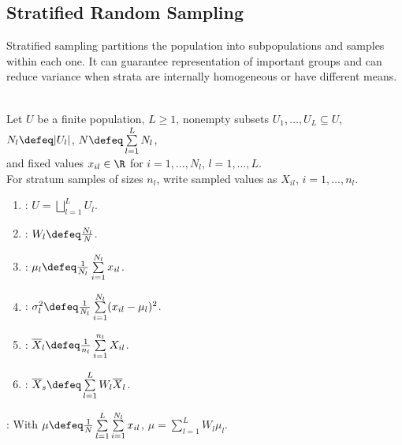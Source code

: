 \subsection{Stratified Random Sampling}

Stratified sampling partitions the population into subpopulations and samples
within each one.  It can guarantee representation of important groups and can
reduce variance when strata are internally homogeneous or have different means.

\begin{definition} \label{def:stratified-sampling-notation} \\
Let $U$ be a finite population, $L\geq1$, nonempty subsets $U_1,\ldots,U_L\subseteq U$, $N_l\defeq|U_l|$, $N\defeq\sum\limits_{l=1}^{L}N_l$,\\
and fixed values $x_{il}\in\R$ for $i=1,\ldots,N_l$, $l=1,\ldots,L$.\\
For stratum samples of sizes $n_l$, write sampled values as $X_{il}$, $i=1,\ldots,n_l$.
\begin{enumerate}[label=(\roman*)]
\setlength{\itemsep}{0pt}
\item {}: $U=\bigsqcup\limits_{l=1}^{L}U_l$.
\item {}: $W_l\defeq \frac{N_l}{N}$.
\item {}: $\mu_l\defeq \frac{1}{N_l}\sum\limits_{i=1}^{N_l}x_{il}$.
\item {}: $\sigma_l^2\defeq \frac{1}{N_l}\sum\limits_{i=1}^{N_l}(x_{il}-\mu_l)^2$.
\item {}: $\overline{X}_l\defeq \frac{1}{n_l}\sum\limits_{i=1}^{n_l}X_{il}$.
\item {}: $\overline{X}_s\defeq\sum\limits_{l=1}^{L}W_l\overline{X}_l$.
\end{enumerate}
: With $\mu\defeq \frac{1}{N}\sum\limits_{l=1}^{L}\sum\limits_{i=1}^{N_l}x_{il}$, $\mu=\sum\limits_{l=1}^{L}W_l\mu_l$.
\end{definition}

